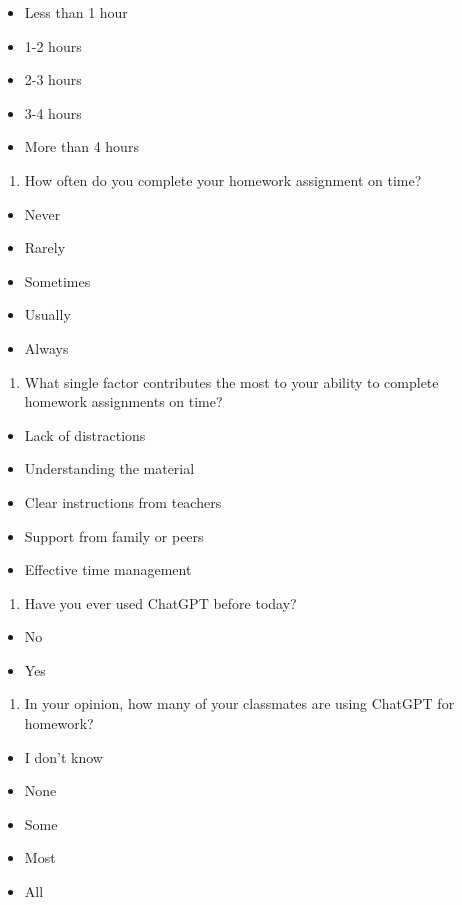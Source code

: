\documentclass[
  12pt,
]{article}
\providecommand{\tightlist}{%
  \setlength{\itemsep}{0pt}\setlength{\parskip}{0pt}}
\begin{document}
\begin{itemize}
\tightlist
\item
  Less than 1 hour
\item
  1-2 hours
\item
  2-3 hours
\item
  3-4 hours
\item
  More than 4 hours
\end{itemize}

\begin{enumerate}
\def\labelenumi{\arabic{enumi}.}
\setcounter{enumi}{27}
\tightlist
\item
  How often do you complete your homework assignment on time?
\end{enumerate}

\begin{itemize}
\tightlist
\item
  Never
\item
  Rarely
\item
  Sometimes
\item
  Usually
\item
  Always
\end{itemize}

\begin{enumerate}
\def\labelenumi{\arabic{enumi}.}
\setcounter{enumi}{28}
\tightlist
\item
  What single factor contributes the most to your ability to complete homework assignments on time?
\end{enumerate}

\begin{itemize}
\tightlist
\item
  Lack of distractions
\item
  Understanding the material
\item
  Clear instructions from teachers
\item
  Support from family or peers
\item
  Effective time management
\end{itemize}

\begin{enumerate}
\def\labelenumi{\arabic{enumi}.}
\setcounter{enumi}{29}
\tightlist
\item
  Have you ever used ChatGPT before today?
\end{enumerate}

\begin{itemize}
\tightlist
\item
  No
\item
  Yes
\end{itemize}

\begin{enumerate}
\def\labelenumi{\arabic{enumi}.}
\setcounter{enumi}{30}
\tightlist
\item
  In your opinion, how many of your classmates are using ChatGPT for homework?
\end{enumerate}

\begin{itemize}
\tightlist
\item
  I don't know
\item
  None
\item
  Some
\item
  Most
\item
  All
\end{itemize}
\end{document}
